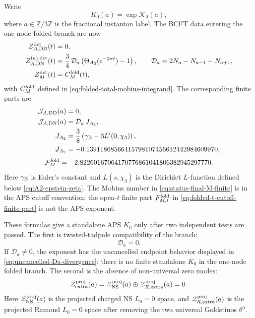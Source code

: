 \documentclass[11pt]{article}
\newcommand{\Z}{\mathbb{Z}}
\newcommand{\NS}{\mathrm{NS}}
\newcommand{\DN}{\mathrm{DN}}
\newcommand{\DD}{\mathrm{DD}}
\newcommand{\e}{\mathrm{e}}
\begin{document}
Write
\begin{equation}
  K_0(a)=\exp\mathcal K_0(a),
  \label{eq:status-K0-exponent-definition}
\end{equation}
where \(a\in\Z/3\Z\) is the fractional instanton label.  The BCFT data entering the
one-node folded branch are now
\begin{align}
  Z_{A,\DD}^{\det}(t)&=0,
  \label{eq:status-final-ADD}
  \\
  Z_{A,\DN}^{(a),\det}(t)
  &=
  \frac34\,\mathcal D_a
  \left(\Theta_{A_2}(\e^{-2\pi t})-1\right),
  \qquad
  \mathcal D_a=2N_a-N_{a-1}-N_{a+1},
  \label{eq:status-final-ADN}
  \\
  Z_M^{\det}(t)&=C_M^{\rm fold}(t),
  \label{eq:status-final-M}
\end{align}
with \(C_M^{\rm fold}\) defined in \eqref{eq:folded-total-mobius-integrand}.  The corresponding
finite parts are
\begin{align}
  \mathcal J_{A,\DD}(a)&=0,
  \label{eq:status-final-ADD-finite}
  \\
  \mathcal J_{A,\DN}(a)
  &=
  \mathcal D_a\,J_{A_2},
  \label{eq:status-final-ADN-finite}
  \\
  J_{A_2}
  &=
  \frac38\left(\gamma_{\rm E}-3L'(0,\chi_3)\right),
  \notag\\
  J_{A_2}
  &=
  -0.13911868566415798107456612442984609970,
\end{align}
\begin{equation}
  \mathcal F_M^{\rm fold}
  =
  -2.82260167064170776861041806382945297770 .
  \label{eq:status-final-M-finite}
\end{equation}
Here \(\gamma_{\rm E}\) is Euler's constant and \(L(s,\chi_3)\) is the Dirichlet
\(L\)-function defined below \eqref{eq:A2-epstein-zeta}.  The Mobius number in
\eqref{eq:status-final-M-finite} is in the APS cutoff convention; the open-\(t\) finite part
\(F_{M,t}^{\rm fold}\) in \eqref{eq:folded-t-cutoff-finite-part} is not the APS exponent.

These formulas give a standalone APS \(K_0\) only after two independent tests are passed.  The
first is twisted-tadpole compatibility of the branch:
\begin{equation}
  \mathcal D_a=0 .
  \label{eq:status-final-tadpole-test}
\end{equation}
If \(\mathcal D_a\ne0\), the exponent has the uncancelled endpoint behavior displayed in
\eqref{eq:uncancelled-Da-divergence}; there is no finite standalone \(K_0\) in the one-node
folded branch.  The second is the absence of non-universal zero modes:
\begin{equation}
  \mathcal Z_{\rm extra}^{\rm proj}(a)
  =
  \mathcal Z_{\NS}^{\rm proj}(a)
  \oplus
  \mathcal Z_{R,{\rm extra}}^{\rm proj}(a)
  =0 .
  \label{eq:status-zero-mode-condition}
\end{equation}
Here \(\mathcal Z_{\NS}^{\rm proj}(a)\) is the projected charged NS \(L_0=0\) space, and
\(\mathcal Z_{R,{\rm extra}}^{\rm proj}(a)\) is the projected Ramond \(L_0=0\) space after
removing the two universal Goldstinos \(\theta^\alpha\).
\end{document}

